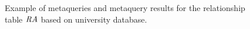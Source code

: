 \documentclass{vldb}
\begin{document}
\begin{figure}[htb]
\begin{center}
\caption{Example of metaqueries and metaquery results for the relationship table $\mathit{RA}$  based on university database.
~\label{fig:meta-query} }
\end{center}
\end{figure}
\end{document}
